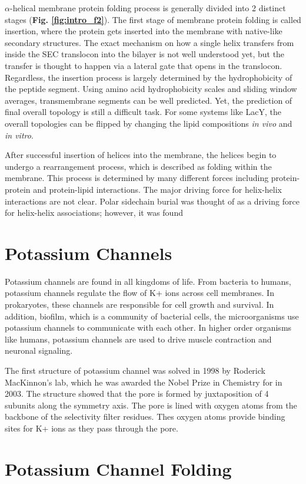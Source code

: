 $\alpha$-helical membrane protein folding process is generally divided into 2 distinct stages (\textbf{Fig. \ref{fig:intro_f2}}). The first stage of membrane protein folding is called insertion, where the protein gets inserted into the membrane with native-like secondary structures. The exact mechanism on how a single helix transfers from inside the SEC translocon into the bilayer is not well understood yet, but the transfer is thought to happen via a lateral gate that opens in the translocon. Regardless, the insertion process is largely determined by the hydrophobicity of the peptide segment. Using amino acid hydrophobicity scales and sliding window averages, transmembrane segments can be well predicted. Yet, the prediction of final overall topology is still a difficult task. For some systems like LacY, the overall topologies can be flipped by changing the lipid compositions \textit{in vivo} and \textit{in vitro}.

After successful insertion of helices into the membrane, the helices begin to undergo a rearrangement process, which is described as folding within the membrane. This process is determined by many different forces including protein-protein and protein-lipid interactions. The major driving force for helix-helix interactions are not clear. Polar sidechain burial was thought of as a driving force for helix-helix associations; however, it was found



\section{Potassium Channels}
Potassium channels are found in all kingdoms of life. From bacteria to humans, potassium channels regulate the flow of K+ ions across cell membranes. In prokaryotes, these channels are responsible for cell growth and survival. In addition, biofilm, which is a community of bacterial cells, the microorganisms use potassium channels to communicate with each other. In higher order organisms like humans, potassium channels are used to drive muscle contraction and neuronal signaling.

The first structure of potassium channel was solved in 1998 by Roderick MacKinnon's lab, which he was awarded the Nobel Prize in Chemistry for in 2003. The structure showed that the pore is formed by juxtaposition of 4 subunits along the symmetry axis. The pore is lined with oxygen atoms from the backbone of the selectivity filter residues. Thes oxygen atoms provide binding sites for K+ ions as they pass through the pore. 


\section{Potassium Channel Folding}



